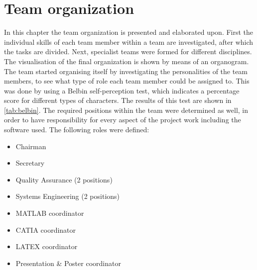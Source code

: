 \documentclass[a4paper]{report}
\begin{document}
\chapter{Team organization}
\label{Chapter:Teamorganization}
In this chapter the team organization is presented and elaborated upon. First the individual skills of each team member within a team are investigated, after which the tasks are divided. Next, specialist teams were formed for different disciplines. The visualisation of the final organization is shown by means of an organogram. \\

The team started organising itself by investigating the personalities of the team members, to see what type of role each team member could be assigned to. This was done by using a Belbin\cite{website:belbin} self-perception test, which indicates a percentage score for different types of characters. The results of this test are shown in  \autoref{tab:belbin}. The required positions within the team were determined as well, in order to have responsibility for every aspect of the project work including the software used. The following roles were defined:

\begin{itemize}
\item Chairman
\item Secretary
\item Quality Assurance (2 positions)
\item Systems Engineering (2 positions)
\item MATLAB coordinator
\item CATIA coordinator
\item LATEX coordinator
\item Presentation \& Poster coordinator

\end{itemize}
\end{document}
